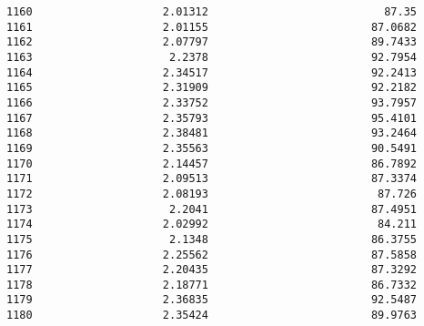 \documentclass[11pt]{article}
\begin{document}
\begin{tcolorbox}[breakable, size=fbox, boxrule=.5pt, pad at break*=1mm, opacityfill=0]
\begin{Verbatim}[commandchars=\\\{\}]
1160                    2.01312                           87.35
1161                    2.01155                         87.0682
1162                    2.07797                         89.7433
1163                     2.2378                         92.7954
1164                    2.34517                         92.2413
1165                    2.31909                         92.2182
1166                    2.33752                         93.7957
1167                    2.35793                         95.4101
1168                    2.38481                         93.2464
1169                    2.35563                         90.5491
1170                    2.14457                         86.7892
1171                    2.09513                         87.3374
1172                    2.08193                          87.726
1173                     2.2041                         87.4951
1174                    2.02992                          84.211
1175                     2.1348                         86.3755
1176                    2.25562                         87.5858
1177                    2.20435                         87.3292
1178                    2.18771                         86.7332
1179                    2.36835                         92.5487
1180                    2.35424                         89.9763


\end{Verbatim}
\end{tcolorbox}
\end{document}
